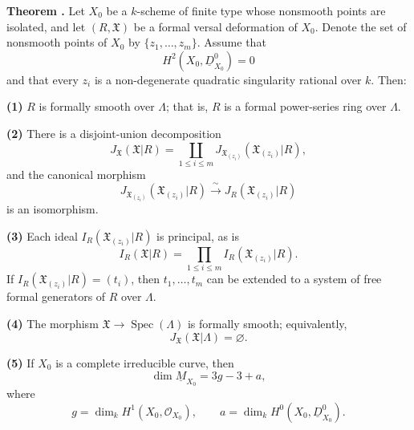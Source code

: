 \par\medskip
\noindent\textbf{Theorem .}
Let $X_0$ be a $k$-scheme of finite type whose nonsmooth points are
isolated, and let $(R,\mathfrak X)$ be a formal versal deformation of
$X_0$. Denote the set of nonsmooth points of $X_0$ by
$\{z_1,\ldots,z_m\}$. Assume that
\[
H^2(X_0,\underline D^0_{X_0})=0
\]
and that every $z_i$ is a non-degenerate quadratic singularity
rational over $k$. Then:

\smallskip
\noindent\textbf{(1)} $R$ is formally smooth over $\Lambda$; that is,
$R$ is a formal power-series ring over $\Lambda$.

\smallskip
\noindent\textbf{(2)} There is a disjoint-union decomposition
\[
J_{\mathfrak X}(\mathfrak X|R)
=\coprod_{1\leq i\leq m}
 J_{\mathfrak X_{(z_i)}}(\mathfrak X_{(z_i)}|R),
\]
and the canonical morphism
\[
J_{\mathfrak X_{(z_i)}}(\mathfrak X_{(z_i)}|R)
 \xrightarrow{\ \sim\ }
J_R(\mathfrak X_{(z_i)}|R)
\]
is an isomorphism.

\smallskip
\noindent\textbf{(3)} Each ideal
$I_R(\mathfrak X_{(z_i)}|R)$ is principal, as is
\[
I_R(\mathfrak X|R)
=\prod_{1\leq i\leq m}I_R(\mathfrak X_{(z_i)}|R).
\]
If $I_R(\mathfrak X_{(z_i)}|R)=(t_i)$, then
$t_1,\ldots,t_m$ can be extended to a system of free formal
generators of $R$ over $\Lambda$.

\smallskip
\noindent\textbf{(4)} The morphism
$\mathfrak X\longrightarrow\operatorname{Spec}(\Lambda)$ is formally
smooth; equivalently,
\[
J_{\mathfrak X}(\mathfrak X|\Lambda)=\varnothing.
\]


\smallskip
\noindent\textbf{(5)} If $X_0$ is a complete irreducible curve, then
\[
\dim\underline M_{X_0}=3g-3+a,
\]
where
\[
g=\dim_kH^1(X_0,\mathcal O_{X_0}),
\qquad
a=\dim_kH^0(X_0,\underline D^0_{X_0}).
\]

